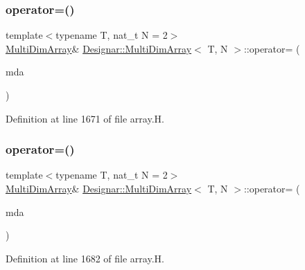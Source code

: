 \subsubsection{\texorpdfstring{operator=()}{operator=()}\hspace{0.1cm}{\footnotesize\ttfamily [1/2]}}
{\footnotesize\ttfamily template$<$typename T, nat\+\_\+t N = 2$>$ \\
\hyperlink{class_designar_1_1_multi_dim_array}{Multi\+Dim\+Array}\& \hyperlink{class_designar_1_1_multi_dim_array}{Designar\+::\+Multi\+Dim\+Array}$<$ T, N $>$\+::operator= (\begin{DoxyParamCaption}\item[{const \hyperlink{class_designar_1_1_multi_dim_array}{Multi\+Dim\+Array}$<$ T, N $>$ \&}]{mda }\end{DoxyParamCaption})\hspace{0.3cm}{\ttfamily [inline]}}



Definition at line 1671 of file array.\+H.

\mbox{\label{class_designar_1_1_multi_dim_array_a45e425f7a1795d97822d8fafe5c02244}} 
\subsubsection{\texorpdfstring{operator=()}{operator=()}\hspace{0.1cm}{\footnotesize\ttfamily [2/2]}}
{\footnotesize\ttfamily template$<$typename T, nat\+\_\+t N = 2$>$ \\
\hyperlink{class_designar_1_1_multi_dim_array}{Multi\+Dim\+Array}\& \hyperlink{class_designar_1_1_multi_dim_array}{Designar\+::\+Multi\+Dim\+Array}$<$ T, N $>$\+::operator= (\begin{DoxyParamCaption}\item[{\hyperlink{class_designar_1_1_multi_dim_array}{Multi\+Dim\+Array}$<$ T, N $>$ \&\&}]{mda }\end{DoxyParamCaption})\hspace{0.3cm}{\ttfamily [inline]}}



Definition at line 1682 of file array.\+H.

\mbox{\label{class_designar_1_1_multi_dim_array_a39d5dcd40ce04bf3113c0f6d83805d0a}} 
